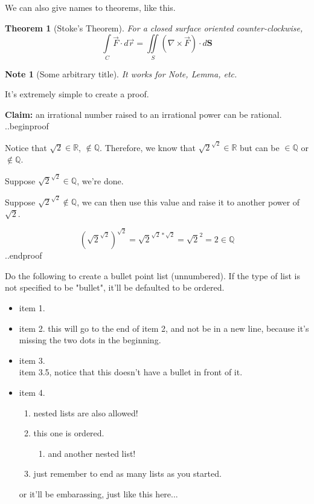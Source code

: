 \documentclass[12pt]{article}
\newtheorem*{Theorem}{Theorem}
\newtheorem{Note}[Lemma]{Note}
\begin{document}
We can also give names to theorems, like this.

\begin{Theorem}[Stoke's Theorem]
For a closed surface oriented counter-clockwise,
\[ \int\limits_C \vec{F} \cdot d\vec{r} = \iint\limits_S (\nabla \times \vec{F}) \cdot d\textbf{S} \]
\end{Theorem}

\begin{Note}[Some arbitrary title]
It works for \emph{Note}, \emph{Lemma}, etc.
\end{Note}

It's extremely simple to create a proof.

\medskip

\textbf{Claim:} an irrational number raised to an irrational power can be rational.
..beginproof

Notice that $\sqrt{2} \in \mathbb{R}$, $\notin \mathbb{Q}$. Therefore, we know that $\sqrt{2}^{\sqrt{2}} \in \mathbb{R}$ but can be $\in \mathbb{Q}$ or $\notin \mathbb{Q}$.

Suppose $\sqrt{2}^{\sqrt{2}} \in \mathbb{Q}$, we're done.

Suppose $\sqrt{2}^{\sqrt{2}} \notin \mathbb{Q}$, we can then use this value and raise it to another power of $\sqrt{2}$.

\[ (\sqrt{2}^{\sqrt{2}})^{\sqrt{2}} = \sqrt{2}^{\sqrt{2} * \sqrt{2}} = \sqrt{2}^2 = 2 \in \mathbb{Q} \]
..endproof


Do the following to create a bullet point list (unnumbered).
If the type of list is not specified to be "bullet", it'll be defaulted to be
ordered.
\begin{itemize}
    \item item 1.
    \item item 2.
    this will go to the end of item 2, and not be in a new line, because it's missing the two dots in the beginning.
    \item item 3.
    \\ item 3.5, notice that this doesn't have a bullet in front of it.
    \item item 4.
    \begin{enumerate}
        \item nested lists are also allowed!
        \item this one is ordered.
        \begin{enumerate}
            \item and another nested list!
        \end{enumerate}
        \item just remember to end as many lists as you started.
    \end{enumerate}
    
    
    or it'll be embarassing, just like this here...
    
\end{itemize}
\end{document}
